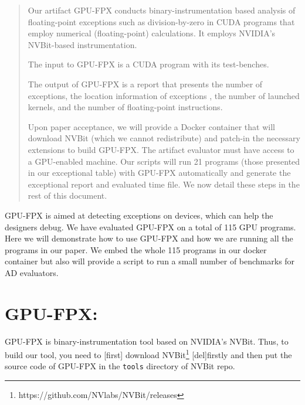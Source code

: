 \documentclass{article}
\begin{document}
	\begin{abstract}
		Our artifact GPU-FPX conducts binary-instrumentation
		based analysis of floating-point exceptions such
		as division-by-zero in CUDA programs that employ
		numerical (floating-point) calculations. It employs
		NVIDIA's NVBit-based instrumentation.
		
		The input to GPU-FPX is a
		CUDA program with its test-benches.
		
		 The output of GPU-FPX is a 
		report that presents the number of exceptions, 
		the location information of exceptions ,
		the number of launched kernels, and 
		the number of floating-point instructions.  
		
		 Upon paper acceptance,
		we will provide a Docker container that will
		download NVBit (which we cannot
		redistribute) and patch-in the necessary
		extensions to build GPU-FPX. The artifact
		evaluator must
		have access to a GPU-enabled machine.
		Our scripts will run 21 programs (those presented
		in our exceptional table) with GPU-FPX automatically
		and generate the exceptional report and evaluated time
		file. 
		We now detail these steps in the rest of this
		document.
	\end{abstract}
	
	GPU-FPX is aimed at detecting exceptions on devices,
	which can help the designers debug. 
	We have evaluated GPU-FPX on a total of 115 GPU programs. Here we will demonstrate how to use GPU-FPX and how we are running all the programs in our paper. We embed the whole 115 programs in our docker container but also will provide a script to run a small number of benchmarks for AD evaluators. 
	
	
	
	
	\section{GPU-FPX: } GPU-FPX is binary-instrumentation tool based on NVIDIA's NVBit. Thus, to build our tool, you need to [first] download NVBit\footnote{https://github.com/NVlabs/NVBit/releases} [del]firstly and then put the source code of GPU-FPX in the {\tt tools} directory of NVBit repo.
	
\end{document}
